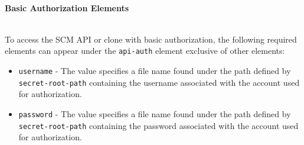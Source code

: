 \noindent\\\textbf{Basic Authorization Elements}

\noindent\\To access the SCM API or clone with basic authorization, the following required elements can
appear under the \texttt{api-auth} element exclusive of other elements:

\begin{itemize}
    \item \texttt{username} - The value specifies a file name found under the path defined
    by \texttt{secret-root-path} containing the username associated with the account used
    for authorization. 
    \item \texttt{password} - The value specifies a file name found under the path defined
    by \texttt{secret-root-path} containing the password associated with the account used
    for authorization. 
\end{itemize}




